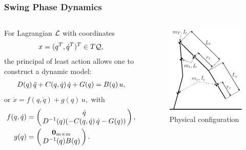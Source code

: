 \documentclass{beamer}
\begin{document}
\begin{frame}
  \frametitle{Swing Phase Dynamics}
  \begin{columns}[t]
    \begin{column}{.55\textwidth}
      For Lagrangian $\mathcal{L}$ with coordinates
      \begin{align*}
        x = (q^{T}, \dot q^{T})^{T} \in T\mathcal{Q},
      \end{align*}
      the principal of least action allows one to construct a dynamic model:
      \begin{align*}
        D(q) \, \ddot q + C(q, \dot q) \, \dot q + G(q) = B(q) \, u,
      \end{align*}
      or $\dot x = f(q, \dot q) + g(q) \, u,$ with
      \begin{align*}
        f(\q, \dq) &= \left(\!\!\begin{array}{c}
        \dq\\
        \D^{-1}(\q) (-\C(\q, \dq) \, \dq - \G(\q))
        \end{array}\!\!\right),\\
        g(\q) &= \left(\!\!\begin{array}{c}
        \mathbf{0}_{m \times m}\\
        \D^{-1}(\q) B(\q)
        \end{array}\!\!\right).
      \end{align*}
    \end{column}\!\!
    \begin{column}{.45\textwidth}
      \begin{figure}
        \centering
        \vspace{-10mm}
        \caption{Physical configuration}
        \includegraphics[width = 1.0\columnwidth]{robot_config}

\end{figure}
\end{column}
\end{columns}
\end{frame}
\end{document}
